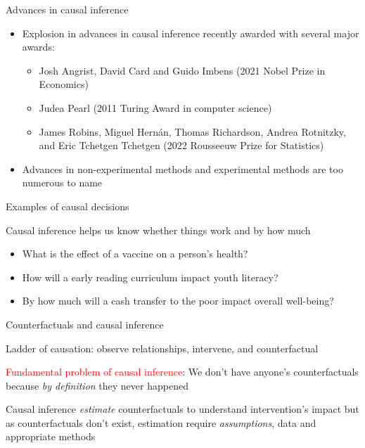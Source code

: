 \documentclass{beamer}
\begin{document}
\begin{frame}{Advances in causal inference}

\begin{itemize}
\item Explosion in advances in causal inference recently awarded with several major awards: 
	\begin{itemize}
	\item Josh Angrist, David Card and Guido Imbens (2021 Nobel Prize in Economics)
	\item Judea Pearl (2011 Turing Award in computer science)
	\item James Robins, Miguel Hernán, Thomas Richardson, Andrea Rotnitzky, and Eric Tchetgen Tchetgen (2022 Rousseeuw Prize for Statistics)
	\end{itemize}
\item Advances in non-experimental methods and experimental methods are too numerous to name
\end{itemize}

\end{frame}



\begin{frame}{Examples of causal decisions}

Causal inference helps us know whether things work and by how much

 
\bigskip


\begin{itemize}
\item  What is the effect of a vaccine on a person’s health? 
\item  How will a early reading curriculum impact youth literacy?  
\item  By how much will a cash transfer to the poor impact overall well-being?
\end{itemize}


\end{frame}


\begin{frame}{Counterfactuals and causal inference}

 Ladder of causation: observe relationships, intervene, and counterfactual

\bigskip

\textcolor{red}{Fundamental problem of causal inference}: We don't have anyone's counterfactuals because \emph{by definition} they never happened

\bigskip

Causal inference \emph{estimate} counterfactuals to understand intervention's impact but as counterfactuals don't exist, estimation require \emph{assumptions}, data and appropriate methods


\end{frame}
\end{document}
